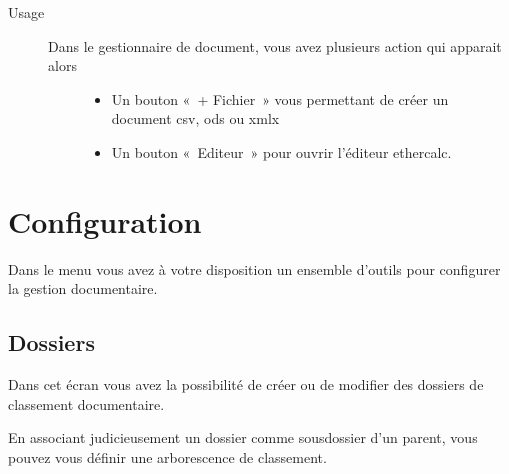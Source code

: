 \documentclass[letterpaper,10pt,french]{sphinxmanual}
\begin{document}
\begin{sphinxVerbatim}[commandchars=\\\{\}]
   
\end{sphinxVerbatim}
\begin{description}
\item[{Usage}] \leavevmode\begin{description}
\item[{Dans le gestionnaire de document, vous avez plusieurs action qui apparait alors}] \leavevmode\begin{itemize}
\item {} 
Un bouton « + Fichier » vous permettant de créer un document csv, ods ou xmlx

\item {} 
Un bouton « Editeur » pour ouvrir l’éditeur ethercalc.

\end{itemize}

\end{description}

\end{description}

\noindent{}


\section{Configuration}
\label{\detokenize{documents/configuration:configuration}}\label{\detokenize{documents/configuration::doc}}
Dans le menu  vous avez à votre disposition un ensemble d’outils pour configurer la gestion documentaire.


\subsection{Dossiers}
\label{\detokenize{documents/configuration:dossiers}}
Dans cet écran vous avez la possibilité de créer ou de modifier des dossiers de classement documentaire.

\noindent{}

En associant judicieusement un dossier comme sous\sphinxhyphen{}dossier d’un parent, vous pouvez vous définir une arborescence de classement.
\end{document}
